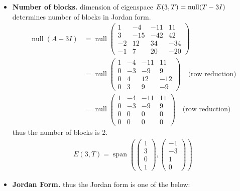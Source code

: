 \documentclass[12pt, letterpaper]{scrartcl}
\DeclareMathOperator{\Span}{span}
\DeclareMathOperator{\Null}{null}
\begin{document}
\begin{itemize}
    \item \textbf{Number of blocks.} dimension of eigenspace $E(3, T)=\Null(T-3I)\\$ determines number of blocks in Jordan form.
    \begin{align*}
        \Null(A-3I)
        &=
        \Null\left(
        \begin{array}{cccc}
          1&-4&-11&11\\
          3&-15&-42&42\\
          -2&12&34&-34\\
          -1&7&20&-20
        \end{array}
        \right)\\
        &=
        \Null\left(
        \begin{array}{cccc}
          1&-4&-11&11\\
          0&-3&-9&9\\
          0&4&12&-12\\
          0&3&9&-9
        \end{array}
        \right) \quad\text{(row reduction)}\\
        &=
        \Null\left(
        \begin{array}{cccc}
          1&-4&-11&11\\
          0&-3&-9&9\\
          0&0&0&0\\
          0&0&0&0
        \end{array}
        \right) \quad\text{(row reduction)}
    \end{align*}
    thus the number of blocks is 2.
    \begin{align*}
        E(3, T)=\Span(
        \left(
        \begin{array}{c}
          1\\
          3\\
          0\\
          1
        \end{array}
        \right)
        ,
        \left(
        \begin{array}{c}
          -1\\
          -3\\
          1\\
          0
        \end{array}
        \right)
        )
    \end{align*}
    \item \textbf{Jordan Form.} thus the Jordan form is one of the below:

\end{itemize}
\end{document}

